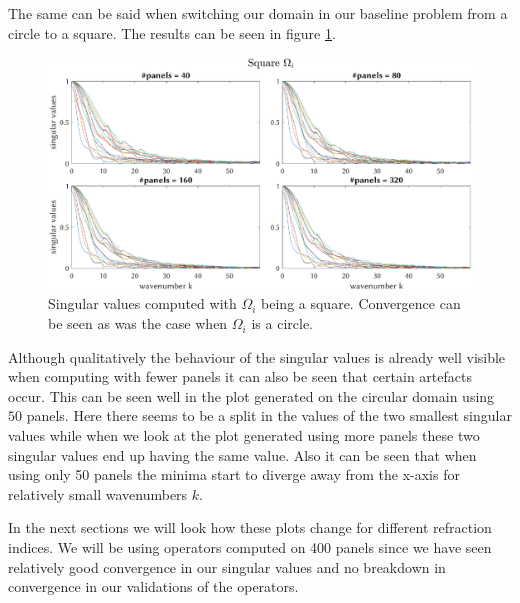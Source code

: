 \documentclass[a4paper, oneside]{discothesis}
\begin{document}
The same can be said when switching our domain in our baseline problem from a circle to a square.
The results can be seen in figure \ref{fig:SVs_square}.
\begin{figure} [!ht]
	\centering
	\includegraphics[width=\columnwidth]{figures/SVs_square.eps}
	\caption{ 
		Singular values computed with $\Omega_i$ being a square. 
		Convergence can be seen as was the case when $\Omega_i$ is a circle.
	}
	\label{fig:SVs_square}
\end{figure}
Although qualitatively the behaviour of the singular values is already well visible when computing with fewer panels it can also be seen that certain artefacts occur.
This can be seen well in the plot generated on the circular domain using $50$ panels.
Here there seems to be a split in the values of the two smallest singular values while when we look at the plot generated using more panels these two singular values end up having the same value.
Also it can be seen that when using only 50 panels the minima start to diverge away from the x-axis for relatively small wavenumbers $k$.

In the next sections we will look how these plots change for different refraction indices.
We will be using operators computed on 400 panels since we have seen relatively good convergence in our singular values and no breakdown in convergence in our validations of the operators.
\end{document}
